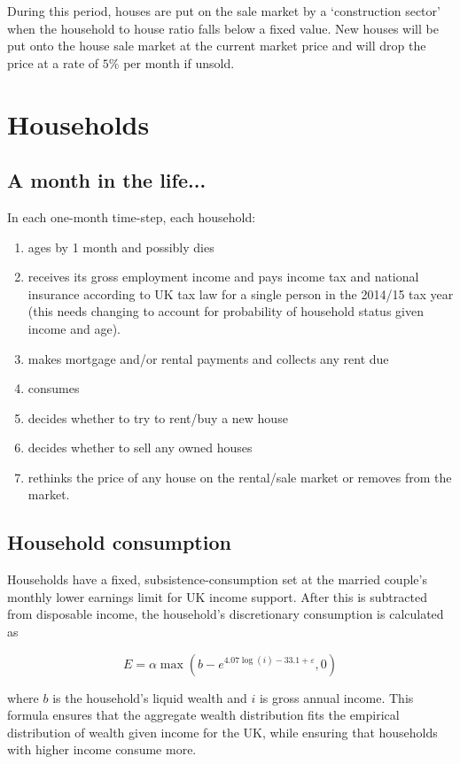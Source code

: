 \documentclass{article}
\begin{document}
During this period, houses are put on the sale market by a `construction sector' when the household to house ratio falls below a fixed value. New houses will be put onto the house sale market at the current market price and will drop the price at a rate of $5\%$ per month if unsold.

\section{Households}

\subsection{A month in the life...}
In each one-month time-step, each household:
\begin{enumerate}
\item ages by 1 month and possibly dies
\item receives its gross employment income and pays income tax and national insurance according to UK tax law for a single person in the 2014/15 tax year (this needs changing to account for probability of household status given income and age).
\item makes mortgage and/or rental payments and collects any rent due
\item consumes
\item decides whether to try to rent/buy a new house
\item decides whether to sell any owned houses
\item rethinks the price of any house on the rental/sale market or removes from the market.
\end{enumerate}

\subsection{Household consumption}

Households have a fixed, subsistence-consumption set at the married couple's monthly lower earnings limit for UK income support. After this is subtracted from disposable income, the household's discretionary consumption is calculated as

\begin{equation}
E=\alpha \max \left( b-e^{4.07\log (i)-33.1+\varepsilon },0\right)
\end{equation}

where $b$ is the household's liquid wealth and $i$ is gross annual income. This formula ensures that the aggregate wealth distribution fits the empirical distribution of wealth given income for the UK, while ensuring that households with higher income consume more.
\end{document}
